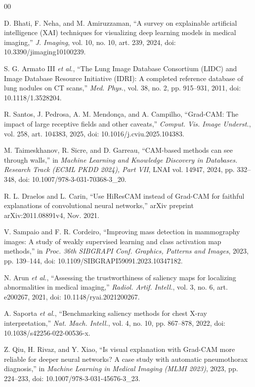 \documentclass[conference]{IEEEtran}
\begin{document}
\begin{thebibliography}{00}

 D. Bhati, F. Neha, and M. Amiruzzaman, ``A survey on explainable artificial intelligence (XAI) techniques for visualizing deep learning models in medical imaging,'' \textit{J. Imaging}, vol. 10, no. 10, art. 239, 2024, doi: 10.3390/jimaging10100239.

 S. G. Armato III \emph{et al.}, ``The Lung Image Database Consortium (LIDC) and Image Database Resource Initiative (IDRI): A completed reference database of lung nodules on CT scans,'' \textit{Med. Phys.}, vol. 38, no. 2, pp. 915--931, 2011, doi: 10.1118/1.3528204.

 R. Santos, J. Pedrosa, A. M. Mendon{\c{c}}a, and A. Campilho, ``Grad-CAM: The impact of large receptive fields and other caveats,'' \textit{Comput. Vis. Image Underst.}, vol. 258, art. 104383, 2025, doi: 10.1016/j.cviu.2025.104383.

 M. Taimeskhanov, R. Sicre, and D. Garreau, ``CAM-based methods can see through walls,'' in \textit{Machine Learning and Knowledge Discovery in Databases. Research Track (ECML PKDD 2024), Part VII}, LNAI vol. 14947, 2024, pp. 332--348, doi: 10.1007/978-3-031-70368-3\_20.

 R. L. Draelos and L. Carin, ``Use HiResCAM instead of Grad-CAM for faithful explanations of convolutional neural networks,'' arXiv preprint arXiv:2011.08891v4, Nov. 2021.

 V. Sampaio and F. R. Cordeiro, ``Improving mass detection in mammography images: A study of weakly supervised learning and class activation map methods,'' in \textit{Proc. 36th SIBGRAPI Conf. Graphics, Patterns and Images}, 2023, pp. 139--144, doi: 10.1109/SIBGRAPI59091.2023.10347182.

 N. Arun \emph{et al.}, ``Assessing the trustworthiness of saliency maps for localizing abnormalities in medical imaging,'' \textit{Radiol. Artif. Intell.}, vol. 3, no. 6, art. e200267, 2021, doi: 10.1148/ryai.2021200267.

 A. Saporta \emph{et al.}, ``Benchmarking saliency methods for chest X-ray interpretation,'' \textit{Nat. Mach. Intell.}, vol. 4, no. 10, pp. 867--878, 2022, doi: 10.1038/s42256-022-00536-x.

 Z. Qiu, H. Rivaz, and Y. Xiao, ``Is visual explanation with Grad-CAM more reliable for deeper neural networks? A case study with automatic pneumothorax diagnosis,'' in \textit{Machine Learning in Medical Imaging (MLMI 2023)}, 2023, pp. 224--233, doi: 10.1007/978-3-031-45676-3\_23.


\end{thebibliography}
\end{document}
